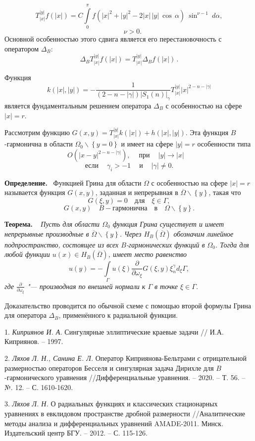 $$
T_{|x|}^{|y|}f(|x|)=C\int\limits_0^{\pi}
f\left(|x|^2+|y|^2-2|x|\,|y|~\cos\,\alpha\right)
~ \sin^{{\nu}-1}~d\alpha,
$$
$$
\quad \nu>0.
$$
 Основной особенностью этого сдвига является его перестановочность с оператором $\Delta_B$:
$$
\Delta_B T_{|x|}^{|y|} f(|x|)=T_{|x|}^{|y|}\Delta_B f(|x|)\,.
$$
 
Функция
$$
k(|x|,|y|)=-\frac{1}{(2-n-|\gamma|)|S_1(n)|_\gamma
}T_{|x|}^{|y|} {|x|^{2-n-|\gamma|}}
$$
является фундаментальным решением оператора $\Delta_B$ с особенностью на сфере $|x|=r$.

Рассмотрим функцию
$ G(x,y)= T_{|x|}^{|y|}k(|x|)+h(|x|,|y|)$.
Эта функция $B$-гармонична в области ${\Omega_0}\backslash\left\{{y=0}\right\}$ и имеет на сфере
 $|y|=r$ особенности типа 
$$
O(|x-y|^{2-n-|\gamma|}),\quad \ \textrm{при} \ \quad |y|\to|x|\quad
$$
$$
\textrm{если} \ \quad \gamma_i>-1\quad \ \textrm{и} \ \quad |\gamma|\neq0.
$$

{\bf Определение.}~ Функцией Грина для области ${\Omega}$ с особенностью на сфере $|x|=r$ называется функция $G(x,y)$, заданная и непрерывная в $\overline{\Omega}\backslash\left\{{y}\right\}$, такая что 
$$
G(\xi,y)=0 \quad \textrm{для} \quad \xi\in \Gamma,
$$
$$
G(x,y)\quad B-\textrm{гармонична} \quad \textrm{в} \quad {\Omega}\backslash\left\{{y}\right\}.
$$

{\bf Теорема.} ~ {\it Пусть для области $\Omega_0$ функция Грина существует и имеет непрерывные производные в $\overline{\Omega}\backslash\left\{{y}\right\}$. Через ${H_B{(\overline{\Omega})}}$ обозначим линейное подпространство,  состоящее из всех $B$-гармонических функций в $\Omega_0$. Тогда для любой функции $u(x)\in{H_B{(\overline{\Omega})}}$,  имеет место равенство
$$
u(y)=-{\int\limits_\Gamma {u(\xi)\frac{\partial}{\partial {\omega_\xi}}{G(\xi,y)}{\xi_n^\gamma}{{d_\xi}\Gamma}}},
$$
где $\frac{\partial}{\partial {\omega_\xi}}$ "--- производная по внешней нормали к $\Gamma$ в точке $\xi\in\Gamma$. }

Доказательство проводится по обычной схеме с помощью второй формулы Грина для оператора $\Delta_B$, применённого к радиальной функции.


\litlist

1. {\it Киприянов И. А.}
 Сингулярные эллиптические краевые задачи // И.А. Киприянов. – 1997.

2. {\it Ляхов Л. Н., Санина Е. Л.}
 Оператор Киприянова-Бельтрами с отрицательной размерностью операторов Бесселя и сингулярная задача Дирихле для $ B $-гармонического уравнения //Дифференциальные уравнения. – 2020. – Т. 56. – №. 12. – С. 1610-1620.

3. {\it Ляхов Л. Н.}
 О радиальных функциях и классических стационарных уравнениях в евклидовом пространстве дробной размерности //Аналитические методы анализа и дифференциальных уравнений AMADE-2011. Минск. Издательский центр БГУ. – 2012. – С. 115-126.
